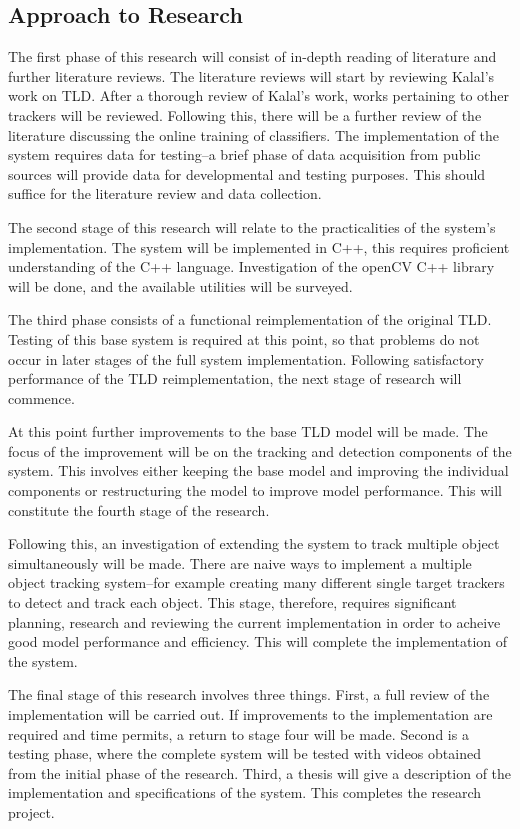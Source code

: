 \subsection{Approach to Research}
  The first phase of this research will consist of in-depth reading of literature and further literature reviews.
  The literature reviews will start by reviewing Kalal's work on TLD.
  After a thorough review of Kalal's work, works pertaining to other trackers will be reviewed.
  Following this, there will be a further review of the literature discussing the online training of classifiers.
  The implementation of the system requires data for testing--a brief phase of data acquisition from public sources will provide data for developmental and testing purposes.
  This should suffice for the literature review and data collection.

  The second stage of this research will relate to the practicalities of the system's implementation.
  The system will be implemented in C++, this requires proficient understanding of the C++ language.
  Investigation of the openCV C++ library will be done, and the available utilities will be surveyed.

  The third phase consists of a functional reimplementation of the original TLD.
  Testing of this base system is required at this point, so that problems do not occur in later stages of the full system implementation.
  Following satisfactory performance of the TLD reimplementation, the next stage of research will commence.

  At this point further improvements to the base TLD model will be made.
  The focus of the improvement will be on the tracking and detection components of the system. 
  This involves either keeping the base model and improving the individual components or restructuring the model to improve model performance.
  This will constitute the fourth stage of the research.

  Following this, an investigation of extending the system to track multiple object simultaneously will be made.
  There are naive ways to implement a multiple object tracking system--for example creating many different single target trackers to detect and track each object.
  This stage, therefore, requires significant planning, research and reviewing the current implementation in order to acheive good model performance and efficiency.
  This will complete the implementation of the system.

  The final stage of this research involves three things.
  First, a full review of the implementation will be carried out.
  If improvements to the implementation are required and time permits, a return to stage four will be made.
  Second is a testing phase, where the complete system will be tested with videos obtained from the initial phase of the research.
  Third, a thesis will give a description of the implementation and specifications of the system.
  This completes the research project.
